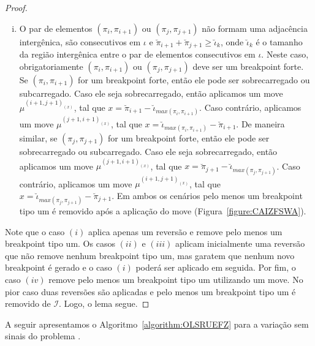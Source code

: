 \begin{proof}
\begin{enumerate}[i.]
  \item O par de elementos $(\pi_{i},\pi_{i+1})$ ou $(\pi_{j},\pi_{j+1})$ não formam uma adjacência intergênica, são consecutivos em $\iota$ e $\breve\pi_{i+1} + \breve\pi_{j+1} \ge \breve\iota_k$, onde $\breve\iota_k$ é o tamanho da região intergênica entre o par de elementos consecutivos em $\iota$. Neste caso, obrigatoriamente $(\pi_{i},\pi_{i+1})$ ou $(\pi_{j},\pi_{j+1})$ deve ser um breakpoint forte. Se $(\pi_{i},\pi_{i+1})$ for um breakpoint forte, então ele pode ser sobrecarregado ou subcarregado. Caso ele seja sobrecarregado, então aplicamos um move $\mu^{(i+1,j+1)_{(x)}}$, tal que $x = \breve\pi_{i+1} - \breve\iota_{max(\pi_{i},\pi_{i+1})}$. Caso contrário, aplicamos um move $\mu^{(j+1,i+1)_{(x)}}$, tal que $x = \breve\iota_{max(\pi_{i},\pi_{i+1})} - \breve\pi_{i+1}$. De maneira similar, se $(\pi_{j},\pi_{j+1})$ for um breakpoint forte, então ele pode ser sobrecarregado ou subcarregado. Caso ele seja sobrecarregado, então aplicamos um move $\mu^{(j+1,i+1)_{(x)}}$, tal que $x = \breve\pi_{j+1} - \breve\iota_{max(\pi_{j},\pi_{j+1})}$. Caso contrário, aplicamos um move $\mu^{(i+1,j+1)_{(x)}}$, tal que $x = \breve\iota_{max(\pi_{j},\pi_{j+1})} - \breve\pi_{j+1}$. Em ambos os cenários pelo menos um breakpoint tipo um é removido após a aplicação do move (Figura~\ref{figure:CAIZFSWA}).
\end{enumerate}
Note que o caso $(i)$ aplica apenas um reversão e remove pelo menos um breakpoint tipo um. Os casos $(ii)$ e $(iii)$ aplicam inicialmente uma reversão que não remove nenhum breakpoint tipo um, mas garatem que nenhum novo breakpoint é gerado e o caso $(i)$ poderá ser aplicado em seguida. Por fim, o caso $(iv)$ remove pelo menos um breakpoint tipo um utilizando um move. No pior caso duas reversões são aplicadas e pelo menos um breakpoint tipo um é removido de $\mathcal{I}$. Logo, o lema segue. 
\end{proof}



A seguir apresentamos o Algoritmo~\ref{algorithm:OLSRUEFZ} para a variação sem sinais do problema \SbIRM{}.  



